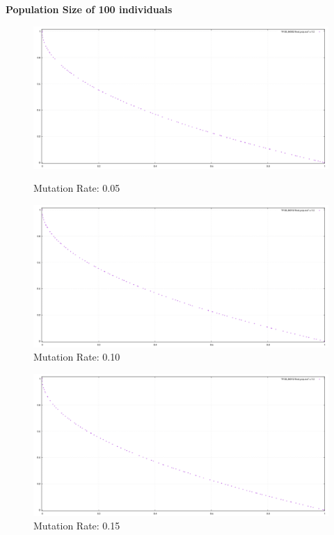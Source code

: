 \documentclass{article}
\begin{document}
\newpage

\textbf{Population Size of 100 individuals}
\begin{figure}[h]
    \centering
    \begin{minipage}{0.49\textwidth}
        \includegraphics[width=\linewidth]{population_plot/P100_M005.png}
        \caption{Mutation Rate: 0.05}
        \label{fig:P100_M005}
    \end{minipage}
    \hfill
    \begin{minipage}{0.49\textwidth}
        \includegraphics[width=\linewidth]{population_plot/P100_M010.png}
        \caption{Mutation Rate: 0.10}
        \label{fig:P100_M010}
    \end{minipage}
\end{figure}

\begin{figure}[h]
    \centering
    \includegraphics[width=0.49\linewidth]{population_plot/P100_M015.png}
    \caption{Mutation Rate: 0.15}
    \label{fig:P100_M015}
\end{figure}
\end{document}
